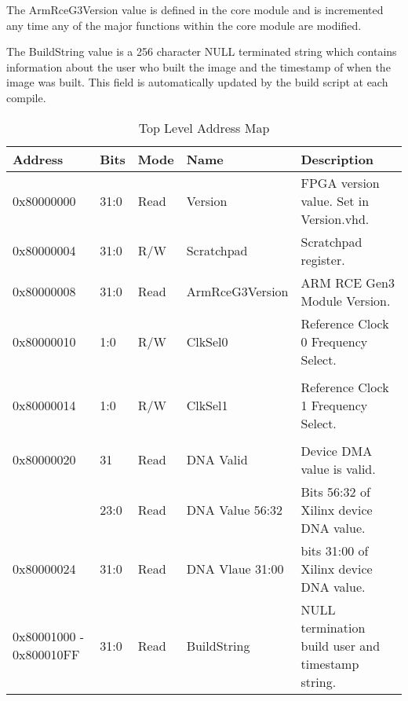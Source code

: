 \documentclass[11pt]{article}
\begin{document}
The ArmRceG3Version value is defined in the core module and is incremented any time any of the major functions within the core module are
modified.

The BuildString value is a 256 character NULL terminated string which contains information about the user who built the image and the 
timestamp of when the image was built. This field is automatically updated by the build script at each compile.

\begin{table}[H]
\small
\centering
   \begin{tabular}{| l | l | l | l | l | } 
      \hline \textbf{Address} & \textbf{Bits} & \textbf{Mode} & \textbf{Name} & \textbf{Description} \\
      \hline 0x80000000       & 31:0          & Read     & Version         & FPGA version value. Set in Version.vhd. \\
      \hline 0x80000004       & 31:0          & R/W      & Scratchpad      & Scratchpad register.                                 \\
      \hline 0x80000008       & 31:0          & Read     & ArmRceG3Version & ARM RCE Gen3 Module Version.                         \\
      \hline 0x80000010       & 1:0           & R/W      & ClkSel0         & Reference Clock 0 Frequency Select. \\               \\
      \hline 0x80000014       & 1:0           & R/W      & ClkSel1         & Reference Clock 1 Frequency Select. \\               \\
      \hline 0x80000020       & 31            & Read     & DNA Valid       & Device DMA value is valid.                           \\
                              & 23:0          & Read     & DNA Value 56:32 & Bits 56:32 of Xilinx device DNA value.               \\
      \hline 0x80000024       & 31:0          & Read     & DNA Vlaue 31:00 & bits 31:00 of Xilinx device DNA value.               \\
      \hline 0x80001000 - 0x800010FF & 31:0   & Read     & BuildString     & NULL termination build user and timestamp string.    \\
      \hline
   \end{tabular}
   \caption{Top Level Address Map}
   \label{tab:top_addr}
\end{table}
\end{document}
